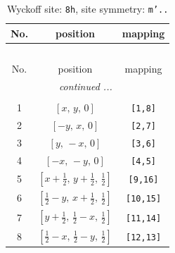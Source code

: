 \documentclass[fleqn,8pt]{jsarticle}
\begin{document}
\begin{longtable}{ccc}
\caption{Wyckoff site: {\tt 8h}, site symmetry: {\tt m'..}}
 \\
 \hline \hline
No. & position & mapping \\ \hline \endfirsthead

\multicolumn{2}{l}{\tablename\ \thetable{}} \\
 \hline \hline
No. & position & mapping \\ \hline \endhead

 \hline \hline
\multicolumn{2}{r}{\footnotesize\it continued ...} \\ \endfoot

 \hline \hline
\multicolumn{2}{r}{} \\ \endlastfoot

1 & $\left[ x,\, y,\, 0 \right]$ & {\tt [1,8]} \\ \hline
2 & $\left[ - y,\, x,\, 0 \right]$ & {\tt [2,7]} \\ \hline
3 & $\left[ y,\, - x,\, 0 \right]$ & {\tt [3,6]} \\ \hline
4 & $\left[ - x,\, - y,\, 0 \right]$ & {\tt [4,5]} \\ \hline
5 & $\left[ x + \frac{1}{2},\, y + \frac{1}{2},\, \frac{1}{2} \right]$ & {\tt [9,16]} \\ \hline
6 & $\left[ \frac{1}{2} - y,\, x + \frac{1}{2},\, \frac{1}{2} \right]$ & {\tt [10,15]} \\ \hline
7 & $\left[ y + \frac{1}{2},\, \frac{1}{2} - x,\, \frac{1}{2} \right]$ & {\tt [11,14]} \\ \hline
8 & $\left[ \frac{1}{2} - x,\, \frac{1}{2} - y,\, \frac{1}{2} \right]$ & {\tt [12,13]} \\
\end{longtable}
\renewcommand{\arraystretch}{1.2}
\end{document}

